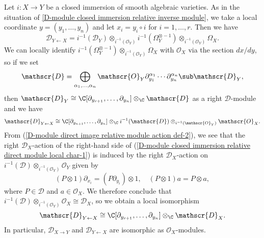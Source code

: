 \begin{example}\label{D-module closed immersion relative direct module local char}
Let $i:X\to Y$ be a closed immersion of smooth algebraic varieties. As in the situation of \cref{D-module closed immersion relative inverse module}, we take a local coordinate $y=(y_1,\dots,y_n)$ and let $x_i=y_i\circ i$ for $i=1,\dots,r$. Then we have 
\[\mathscr{D}_{Y\leftarrow X}=i^{-1}(\mathscr{D}_Y)\otimes_{i^{-1}(\mathscr{O}_Y)}i^{-1}(\Omega_Y^{\otimes-1})\otimes_{i^{-1}(\mathscr{O}_Y)}\Omega_X.\]
We can locally identify $i^{-1}(\Omega_Y^{\otimes-1})\otimes_{i^{-1}(\mathscr{O}_Y)}\Omega_X$ with $\mathscr{O}_X$ via the section $dx/dy$, so if we set
\[\mathscr{D}=\bigoplus_{\alpha_1,\dots,\alpha_n}\mathscr{O}_Y\partial_{y_1}^{\alpha_1}\cdots\partial_{y_n}^{\alpha_n}\sub\mathscr{D}_Y,\]
then $\mathscr{D}_Y\cong\C[\partial_{y_{r+1}},\dots,\partial_{y_n}]\otimes_{\C}\mathscr{D}$ as a right $\mathscr{D}$-module and we have
\begin{equation}\label{D-module closed immersion relative direct module local char-1}
\mathscr{D}_{Y\leftarrow X}\cong \C[\partial_{y_{n+1}},\dots,\partial_{y_n}]\otimes_{\C}i^{-1}(\mathscr{D})\otimes_{i^{-1}(\mathscr{O}_Y)}\mathscr{O}_X.
\end{equation}
From (\ref{D-module direct image relative module action def-2}), we see that the right $\mathscr{D}_X$-action of the right-hand side of (\ref{D-module closed immersion relative direct module local char-1}) is induced by the right $\mathscr{D}_X$-action on $i^{-1}(\mathscr{D})\otimes_{i^{-1}(\mathscr{O}_Y)}\mathscr{O}_Y$ given by
\[(P\otimes 1)\partial_{x_i}=(P\partial_{y_i})\otimes 1,\quad (P\otimes 1)a=P\otimes a,\]
where $P\in\mathscr{D}$ and $a\in\mathscr{O}_X$. We therefore conclude that $i^{-1}(\mathscr{D})\otimes_{i^{-1}(\mathscr{O}_Y)}\mathscr{O}_X\cong\mathscr{D}_X$, so we obtain a local isomorphism
\[\mathscr{D}_{Y\leftarrow X}\cong\C[\partial_{y_{r+1}},\dots,\partial_{y_n}]\otimes_{\C}\mathscr{D}_X.\]
In particular, $\mathscr{D}_{X\to Y}$ and $\mathscr{D}_{Y\leftarrow X}$ are isomorphic as $\mathscr{O}_X$-modules.
\end{example}

